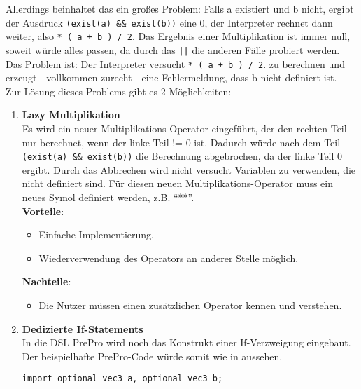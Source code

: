 Allerdings beinhaltet das  ein großes Problem:
Falls a existiert und b nicht, ergibt der Ausdruck \texttt{(exist(a) \&\& exist(b))} eine 0, der Interpreter rechnet dann weiter, also \texttt{* ( a + b ) / 2}.
Das Ergebnis einer Multiplikation ist immer null, soweit würde alles passen, da durch das \texttt{||} die anderen Fälle probiert werden.
Das Problem ist:
Der Interpreter versucht \texttt{* ( a + b ) / 2}. zu berechnen und erzeugt - vollkommen zurecht - eine Fehlermeldung, dass b nicht definiert ist.\\
Zur Lösung dieses Problems gibt es 2 Möglichkeiten:
\begin{enumerate}
\item \textbf{Lazy Multiplikation}\\
Es wird ein neuer Multiplikations-Operator eingeführt, der den rechten Teil nur berechnet, wenn der linke Teil != 0 ist.
Dadurch würde nach dem Teil \texttt{(exist(a) \&\& exist(b))} die Berechnung abgebrochen, da der linke Teil 0 ergibt.
Durch das Abbrechen wird nicht versucht Variablen zu verwenden, die nicht definiert sind.
Für diesen neuen Multiplikations-Operator muss ein neues Symol definiert werden, z.B. ``**''.\\
\textbf{Vorteile}:
\begin{itemize}
\item Einfache Implementierung.
\item Wiederverwendung des Operators an anderer Stelle möglich.
\end{itemize}
\textbf{Nachteile}:
\begin{itemize}
\item Die Nutzer müssen einen zusätzlichen Operator kennen und verstehen.
\end{itemize}

\item \textbf{Dedizierte If-Statements}\\
In die \ac{DSL} PrePro wird noch das Konstrukt einer If-Verzweigung eingebaut.
Der beispielhafte PrePro-Code würde somit wie in  aussehen.
\begin{lstlisting}[language=prepro, label={lst:OptionalImportExample_If}, caption={PrePro-Code mit If-Statements und der exists-Funktion}, captionpos=b]
import optional vec3 a, optional vec3 b;


\end{lstlisting}
\end{enumerate}

